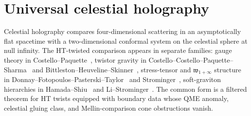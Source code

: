 %
%

\providecommand{\cA}{\mathcal A}
\providecommand{\cB}{\mathcal B}
\providecommand{\cC}{\mathcal C}
\providecommand{\cE}{\mathcal E}
\providecommand{\cF}{\mathcal F}
\providecommand{\cH}{\mathcal H}
\providecommand{\cI}{\mathcal I}
\providecommand{\cL}{\mathcal L}
\providecommand{\cM}{\mathcal M}
\providecommand{\cO}{\mathcal O}
\providecommand{\cP}{\mathcal P}
\providecommand{\cS}{\mathcal S}
\providecommand{\cT}{\mathcal T}
\providecommand{\cW}{\mathcal W}
\providecommand{\RR}{\mathbb R}
\providecommand{\CC}{\mathbb C}
\providecommand{\PP}{\mathbb P}
\providecommand{\ZZ}{\mathbb Z}
\providecommand{\NN}{\mathbb N}
\providecommand{\HH}{\mathbb H}
\providecommand{\scri}{\mathscr I}
\providecommand{\Ran}{\operatorname{Ran}}
\providecommand{\Sym}{\operatorname{Sym}}
\providecommand{\Obs}{\operatorname{Obs}}
\providecommand{\Cone}{\operatorname{Cone}}
\providecommand{\gr}{\operatorname{gr}}
\providecommand{\End}{\operatorname{End}}
\providecommand{\Hom}{\operatorname{Hom}}
\providecommand{\Res}{\operatorname{Res}}
\providecommand{\Mel}{\widetilde}
\providecommand{\SCchtop}{\mathsf{SC}^{\mathrm{ch,top}}}
\providecommand{\Barch}{\mathrm B^{\mathrm{ch}}}
\providecommand{\BarchOrd}{\mathrm B^{\mathrm{ch},\mathrm{ord}}}
\providecommand{\ChirHoch}{\mathrm{ChirHoch}}
\providecommand{\dlog}{\mathrm d\log}
\providecommand{\delbar}{\bar\partial}
\providecommand{\vf}{\boldsymbol\eta}
\providecommand{\wtc}{\mathfrak w_{1+\infty}}
\providecommand{\kap}{\kappaChHodge}

\section{Universal celestial holography}
\label{sec:universal-celestial-holography}

\noindent
Celestial holography compares four-dimensional scattering in an
asymptotically flat spacetime with a two-dimensional conformal system
on the celestial sphere at null infinity. The HT-twisted comparison
appears in separate families: gauge theory in
Costello--Paquette~\cite{CostelloPaquetteTwistedSugraStates,
CostelloPaquetteIIBTwist}, twistor gravity in
Costello--Costello--Paquette--Sharma~\cite{CostelloPaquetteSharmaCelestial}
and Bittleston--Heuveline--Skinner~\cite{BittlestonHeuvelineSkinner},
stress-tensor and $\wtc$ structure in
Donnay--Fotopoulos--Pasterski--Taylor~\cite{DonnayFotopoulosPasterskiTaylor21,
DonnayFotopoulosPasterskiTaylor22} and
Strominger~\cite{StromingerWInfinityCelestial}, soft-graviton hierarchies
in Hamada--Shiu~\cite{HamadaShiuSubsubSoft} and
Li--Strominger~\cite{LiStromingerHigherSoft}. The common form is a
filtered theorem for HT twists equipped with boundary data whose QME
anomaly, celestial gluing class, and Mellin-comparison cone
obstructions vanish.

